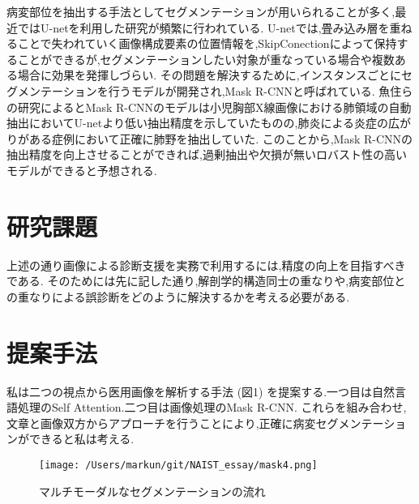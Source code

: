 \documentclass[a4j,10pt, twocolumn]{jarticle}
\begin{document}
病変部位を抽出する手法としてセグメンテーションが用いられることが多く,最近ではU-netを利用した研究が頻繁に行われている\cite{近藤堅司2018u}.
U-netでは,畳み込み層を重ねることで失われていく画像構成要素の位置情報を,SkipConectionによって保持することができるが,セグメンテーションしたい対象が重なっている場合や複数ある場合に効果を発揮しづらい.
その問題を解決するために,インスタンスごとにセグメンテーションを行うモデルが開発され,Mask R-CNNと呼ばれている\cite{he2017mask}.
魚住らの研究によるとMask R-CNNのモデルは小児胸部X線画像における肺領域の自動抽出においてU-netより低い抽出精度を示していたものの,肺炎による炎症の広がりがある症例において正確に肺野を抽出していた\cite{魚住春日2020mask}.
このことから,Mask R-CNNの抽出精度を向上させることができれば,過剰抽出や欠損が無いロバスト性の高いモデルができると予想される.

\section{研究課題}
上述の通り画像による診断支援を実務で利用するには,精度の向上を目指すべきである.
そのためには先に記した通り,解剖学的構造同士の重なりや,病変部位との重なりによる誤診断をどのように解決するかを考える必要がある.

\section{提案手法}
私は二つの視点から医用画像を解析する手法 (図1) を提案する.一つ目は自然言語処理のSelf Attention\cite{vaswani2017attention}.二つ目は画像処理のMask R-CNN.
これらを組み合わせ,文章と画像双方からアプローチを行うことにより,正確に病変セグメンテーションができると私は考える.

\begin{figure}[ht]%
    \texttt{[image: /Users/markun/git/NAIST\_essay/mask4.png]}
    \caption{マルチモーダルなセグメンテーションの流れ}
\end{figure}

\end{document}
